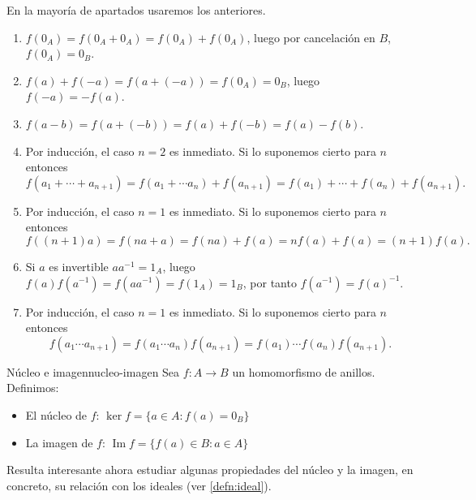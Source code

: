\begin{proofbox}
    En la mayoría de apartados usaremos los anteriores.
    \begin{enumerate}
        \item \(f(0_A) = f(0_A + 0_A) = f(0_A) + f(0_A)\), luego por cancelación en \(B\), \(f(0_A) = 0_B\).
        
        \item \(f(a) + f(-a) = f(a + (-a)) = f(0_A) = 0_B\), luego \(f(-a) = -f(a)\).

        \item \(f(a - b) = f(a + (-b)) = f(a) + f(-b) = f(a) - f(b)\).

        \item Por inducción, el caso $n = 2$ es inmediato. Si lo suponemos cierto para $n$ entonces
        \[
        f(a_1 + \cdots + a_{n+1}) = f(a_1 + \cdots a_n) + f(a_{n+1}) = f(a_1) + \cdots + f(a_n) + f(a_{n+1}).
        \]
        
        \item Por inducción, el caso $n = 1$ es inmediato. Si lo suponemos cierto para $n$ entonces
        \[
        f((n+1) a) = f(na + a) = f(na) + f(a) = nf(a) + f(a) = (n+1) f(a).
        \]

        \item Si \(a\) es invertible \(aa^{-1} = 1_A\), luego \(f(a)f(a^{-1}) = f(aa^{-1}) = f(1_A) = 1_B\), por tanto \(f(a^{-1}) = f(a)^{-1}\).

        \item Por inducción, el caso $n = 1$ es inmediato. Si lo suponemos cierto para $n$ entonces
        \[
        f(a_1 \cdots a_{n+1}) = f(a_1 \cdots a_n)f(a_{n+1}) = f(a_1) \cdots f(a_n) f(a_{n+1}).
        \]
    \end{enumerate}
\end{proofbox}

\begin{definition}{Núcleo e imagen}{nucleo-imagen}
    Sea \(f: A \to B\) un homomorfismo de anillos. Definimos:
    \begin{itemize}
        \item El {núcleo} de \(f\): \(\ker f = \{a \in A : f(a) = 0_B\}\)
        \item La {imagen} de \(f\): \(\operatorname{Im} f = \{f(a) \in B : a \in A\}\)
    \end{itemize}
\end{definition}

Resulta interesante ahora estudiar algunas propiedades del núcleo y la imagen, en concreto, su relación con los ideales (ver \ref{defn:ideal}).

